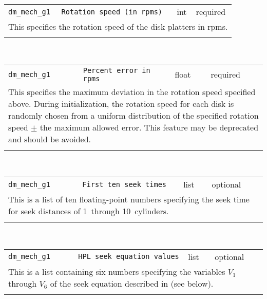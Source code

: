 \noindent 
\begin{tabular}{|p{1.5in}|p{3.5in}|p{0.5in}|p{0.5in}|}
\cline{1-4}
\texttt{dm\_mech\_g1} & \texttt{Rotation speed (in rpms)} & int & required \\ 
\cline{1-4}
\multicolumn{4}{|p{6in}|}{
This specifies the rotation speed of the disk platters in rpms.
}\\ 
\cline{1-4}
\multicolumn{4}{p{5in}}{}\\
\end{tabular}\\ 
\noindent 
\begin{tabular}{|p{1.5in}|p{3.5in}|p{0.5in}|p{0.5in}|}
\cline{1-4}
\texttt{dm\_mech\_g1} & \texttt{Percent error in rpms} & float & required \\ 
\cline{1-4}
\multicolumn{4}{|p{6in}|}{
This specifies the maximum deviation in the rotation speed specified
above. During initialization, the rotation speed for each
disk is randomly chosen from a uniform distribution of the specified
rotation speed $\pm$ the maximum allowed error.
This feature may be deprecated and should be avoided.
}\\ 
\cline{1-4}
\multicolumn{4}{p{5in}}{}\\
\end{tabular}\\ 
\noindent 
\begin{tabular}{|p{1.5in}|p{3.5in}|p{0.5in}|p{0.5in}|}
\cline{1-4}
\texttt{dm\_mech\_g1} & \texttt{First ten seek times} & list & optional \\ 
\cline{1-4}
\multicolumn{4}{|p{6in}|}{
This is a list of ten floating-point numbers specifying the seek time for seek
distances of 1~through 10~cylinders.
}\\ 
\cline{1-4}
\multicolumn{4}{p{5in}}{}\\
\end{tabular}\\ 
\noindent 
\begin{tabular}{|p{1.5in}|p{3.5in}|p{0.5in}|p{0.5in}|}
\cline{1-4}
\texttt{dm\_mech\_g1} & \texttt{HPL seek equation values} & list & optional \\ 
\cline{1-4}
\multicolumn{4}{|p{6in}|}{
This is a list containing six numbers specifying the variables
$V_1$ through $V_6$ of the seek equation described in \cite{Ruemmler94}
(see below).
}\\ 
\cline{1-4}
\multicolumn{4}{p{5in}}{}\\
\end{tabular}\\ 
